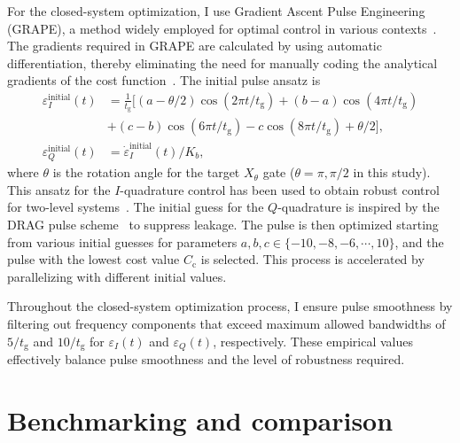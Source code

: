 For the closed-system optimization, I use Gradient Ascent Pulse Engineering (GRAPE), a method widely employed for optimal control in various contexts~\cite{khaneja2005optimalrobustmetric,lu2023optimalgrape,koch2022quantumqocreview}. The gradients required in GRAPE are calculated by using automatic differentiation, thereby eliminating the need for manually coding the analytical gradients of the cost function~\cite{adscalingbaydin2014automatic,pacleung2017speedup,abdelhafez2019gradient}. The initial pulse ansatz is
\begin{align}
\label{eq:initial_pulse}
    \varepsilon^\text{initial}_I(t) &=\frac{1}{t_\text{g}}\big[ (a-\theta/2)\cos(2\pi t /t_\text{g}) + (b-a)\cos(4\pi t /t_\text{g})\\ 
\nonumber     &+(c-b)\cos(6\pi t / t_\text{g}) - c\cos(8\pi t / t_\text{g}) + \theta/2\big],\\
\nonumber    \varepsilon_Q^\text{initial}(t) & = \dot{\varepsilon}_I^\text{initial}(t) / K_b,
\end{align}
where $\theta$ is the rotation angle for the target $X_\theta$ gate ($\theta=\pi,\pi/2$ in this study). This ansatz for the $I$-quadrature control has been used to obtain robust control for two-level systems~\cite{pasini2009optimizedinitialpulse}. The initial guess for the $Q$-quadrature is inspired by the DRAG pulse scheme~\cite{Motzoi2009} to suppress leakage. 
The pulse is then optimized starting from various initial guesses for parameters $a,b,c\in\{-10,-8,-6,\cdots,10\}$, and the pulse with the lowest cost value $C_\text{c}$ is selected. This process is accelerated by parallelizing with different initial values.

Throughout the closed-system optimization process, I ensure pulse smoothness by filtering out frequency components that exceed maximum allowed bandwidths of $5/t_\text{g}$ and $10/t_\text{g}$ for $\varepsilon_I(t)$ and $\varepsilon_Q(t)$, respectively. These empirical values effectively balance pulse smoothness and the level of robustness required.

\section{Benchmarking and comparison}
\label{sec:benchmarking}

